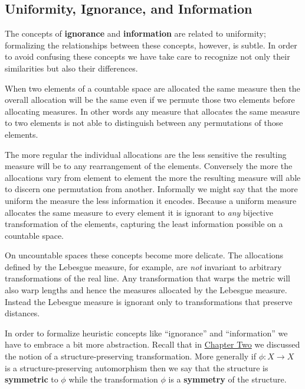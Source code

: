 \documentclass[
  letterpaper,
  DIV=11,
  numbers=noendperiod]{scrartcl}
\begin{document}
\hypertarget{uniformity-ignorance-and-information}{%
\subsection{Uniformity, Ignorance, and
Information}\label{uniformity-ignorance-and-information}}

The concepts of \textbf{ignorance} and \textbf{information} are related
to uniformity; formalizing the relationships between these concepts,
however, is subtle. In order to avoid confusing these concepts we have
take care to recognize not only their similarities but also their
differences.

When two elements of a countable space are allocated the same measure
then the overall allocation will be the same even if we permute those
two elements before allocating measures. In other words any measure that
allocates the same measure to two elements is not able to distinguish
between any permutations of those elements.

The more regular the individual allocations are the less sensitive the
resulting measure will be to any rearrangement of the elements.
Conversely the more the allocations vary from element to element the
more the resulting measure will able to discern one permutation from
another. Informally we might say that the more uniform the measure the
less information it encodes. Because a uniform measure allocates the
same measure to every element it is ignorant to \emph{any} bijective
transformation of the elements, capturing the least information possible
on a countable space.

On uncountable spaces these concepts become more delicate. The
allocations defined by the Lebesgue measure, for example, are \emph{not}
invariant to arbitrary transformations of the real line. Any
transformation that warps the metric will also warp lengths and hence
the measures allocated by the Lebesgue measure. Instead the Lebesgue
measure is ignorant only to transformations that preserve distances.

In order to formalize heuristic concepts like ``ignorance'' and
``information'' we have to embrace a bit more abstraction. Recall that
in
\href{https://betanalpha.github.io/assets/chapters_html/spaces.html}{Chapter
Two} we discussed the notion of a structure-preserving transformation.
More generally if \(\phi : X \rightarrow X\) is a structure-preserving
automorphism then we say that the structure is \textbf{symmetric} to
\(\phi\) while the transformation \(\phi\) is a \textbf{symmetry} of the
structure.
\end{document}
